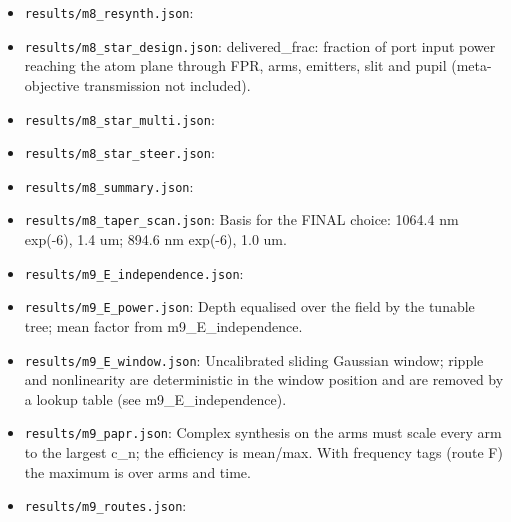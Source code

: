 \begin{itemize}
  router sends power only to lit ports, so per-tweezer power is
  independent of the number lit.
\item
  \texttt{results/m8\_resynth.json}:
\item
  \texttt{results/m8\_star\_design.json}: delivered\_frac: fraction of
  port input power reaching the atom plane through FPR, arms, emitters,
  slit and pupil (meta-objective transmission not included).
\item
  \texttt{results/m8\_star\_multi.json}:
\item
  \texttt{results/m8\_star\_steer.json}:
\item
  \texttt{results/m8\_summary.json}:
\item
  \texttt{results/m8\_taper\_scan.json}: Basis for the FINAL choice:
  1064.4 nm exp(-6), 1.4 um; 894.6 nm exp(-6), 1.0 um.
\item
  \texttt{results/m9\_E\_independence.json}:
\item
  \texttt{results/m9\_E\_power.json}: Depth equalised over the field by
  the tunable tree; mean factor from m9\_E\_independence.
\item
  \texttt{results/m9\_E\_window.json}: Uncalibrated sliding Gaussian
  window; ripple and nonlinearity are deterministic in the window
  position and are removed by a lookup table (see m9\_E\_independence).
\item
  \texttt{results/m9\_papr.json}: Complex synthesis on the arms must
  scale every arm to the largest \textbar c\_n\textbar; the efficiency
  is mean/max. With frequency tags (route F) the maximum is over arms
  and time.
\item
  \texttt{results/m9\_routes.json}:
\end{itemize}
